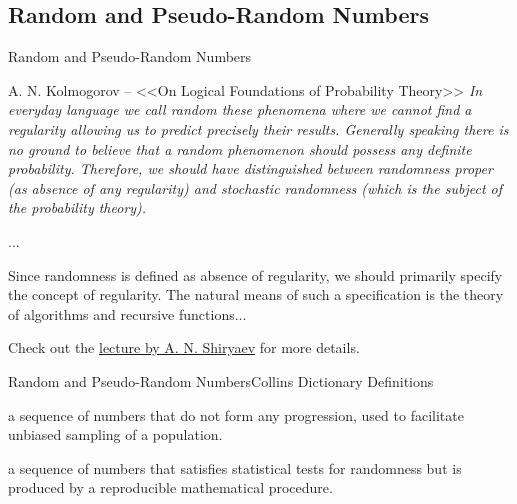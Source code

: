 \subsection{Random and Pseudo-Random Numbers}
    \begin{frame}{Random and Pseudo-Random Numbers}
        \begin{block}{A. N. Kolmogorov -- <<On Logical Foundations of Probability Theory>>}
            \it In everyday language we call random these phenomena where we cannot find a regularity allowing us to predict precisely their results. Generally speaking there is no ground to believe that a random phenomenon should possess any definite probability. Therefore, we should have distinguished between randomness proper
            (as absence of any regularity) and stochastic randomness (which is the subject of the probability theory).

            ...

            Since randomness is defined as absence of regularity, we should
            primarily specify the concept of regularity. The natural means of such a specification is the theory of algorithms and recursive functions...
        \end{block}
        Check out the \href{https://youtu.be/qKVoFqp1DzA}{lecture by A. N. Shiryaev} for more details.
    \end{frame}

    \begin{frame}{Random and Pseudo-Random Numbers}{Collins Dictionary Definitions}
        \begin{definition}
            a sequence of numbers that do not form any progression, used to facilitate unbiased sampling of a population.
        \end{definition}
        \begin{definition}
            a sequence of numbers that satisfies statistical tests for randomness but is produced by a reproducible mathematical procedure.
        \end{definition}
    \end{frame}

